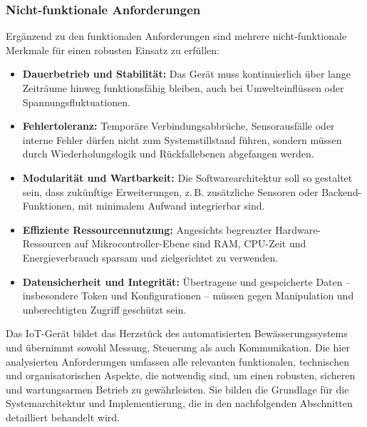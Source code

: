 \subsubsection{Nicht-funktionale Anforderungen}

Ergänzend zu den funktionalen Anforderungen sind mehrere nicht-funktionale Merkmale für einen robusten Einsatz zu erfüllen:

\begin{itemize}
	\item \textbf{Dauerbetrieb und Stabilität:} Das Gerät muss kontinuierlich über lange Zeiträume hinweg funktionsfähig bleiben, auch bei Umwelteinflüssen oder Spannungsfluktuationen.
	
	\item \textbf{Fehlertoleranz:} Temporäre Verbindungsabbrüche, Sensorausfälle oder interne Fehler dürfen nicht zum Systemstillstand führen, sondern müssen durch Wiederholungslogik und Rückfallebenen abgefangen werden.
	
	\item \textbf{Modularität und Wartbarkeit:} Die Softwarearchitektur soll so gestaltet sein, dass zukünftige Erweiterungen, z.\,B. zusätzliche Sensoren oder Backend-Funktionen, mit minimalem Aufwand integrierbar sind.
	
	\item \textbf{Effiziente Ressourcennutzung:} Angesichts begrenzter Hardware-Ressourcen auf Mikrocontroller-Ebene sind RAM, CPU-Zeit und Energieverbrauch sparsam und zielgerichtet zu verwenden.
	
	\item \textbf{Datensicherheit und Integrität:} Übertragene und gespeicherte Daten – insbesondere Token und Konfigurationen – müssen gegen Manipulation und unberechtigten Zugriff geschützt sein.
\end{itemize}

\vspace{1em}
\noindent Das IoT-Gerät bildet das Herzstück des automatisierten Bewässerungssystems und übernimmt sowohl Messung, Steuerung als auch Kommunikation. Die hier analysierten Anforderungen umfassen alle relevanten funktionalen, technischen und organisatorischen Aspekte, die notwendig sind, um einen robusten, sicheren und wartungsarmen Betrieb zu gewährleisten. Sie bilden die Grundlage für die Systemarchitektur und Implementierung, die in den nachfolgenden Abschnitten detailliert behandelt wird.
